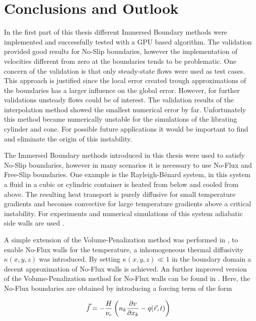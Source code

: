 \chapter*{Conclusions and Outlook}

In the first part of this thesis different Immersed Boundary methods were
implemented and successfully tested with a GPU based algorithm.
The validation provided good results for No-Slip boundaries, however the implementation of velocities different from zero at the boundaries tends to be problematic.
One concern of the validation is that only steady-state flows were used as test cases.
This approach is justified since the local error created trough approximations of the boundaries
has a larger influence on the global error.
However, for further validations unsteady flows could be of interest.
The validation results of the interpolation method showed the smallest numerical error by far.
Unfortunately this method became numerically unstable for the simulations of the librating cylinder and cone.
For possible future applications it would be important to find and eliminate the origin of this instability.

The Immersed Boundary methods introduced in this thesis were used to satisfy No-Slip boundaries, however
in many scenarios it is necessary to use No-Flux and Free-Slip boundaries.
One example is the Rayleigh-B\'{e}nard system,
in this system a fluid in a cubic or cylindric container is heated from below and cooled from above.
The resulting heat transport is purely diffusive for small temperature gradients and
becomes convective for large temperature gradients above a critical instability.
For experiments and numerical simulations of this system adiabatic side walls are used \citep{Lulff2011}.

A simple extension of the Volume-Penalization method was performed in \citep{Lulff2011},
to enable No-Flux walls for the temperature, a inhomogeneous thermal diffusivity $\kappa (x, y, z)$ was introduced.
By setting $\kappa(x, y, z) \ll 1$ in the boundary domain  a decent approximation of No-Flux walls \citep{Lulff2011} is achieved.
An further improved version of the Volume-Penalization method for No-Flux walls can be found in \citep{Brown-Dymkoski2014}.
Here, the No-Flux boundaries are obtained by introducing a forcing term of the form

\begin{align}
    \vec{f}  = -\frac{H}{\nu_c}\left( n_k\pdn[v]{x_k} - q(\vec{r}, t) \right)
\end{align}

